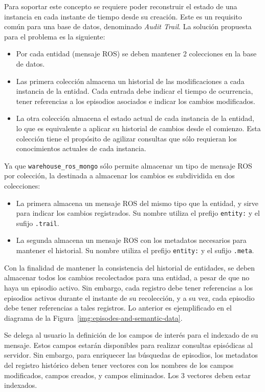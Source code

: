 Para soportar este concepto se requiere poder reconstruir el estado de una instancia en cada instante de tiempo desde su creación. Este es un requisito común para una base de datos, denominado \textit{Audit Trail}. La solución propuesta para el problema es la siguiente:
\begin{itemize}
\item Por cada entidad (mensaje ROS) se deben mantener 2 colecciones en la base de datos.
\item Las primera colección almacena un historial de las modificaciones a cada instancia de la entidad. Cada entrada debe indicar el tiempo de ocurrencia, tener referencias a los episodios asociados e indicar los cambios modificados.
\item La otra colección almacena el estado actual de cada instancia de la entidad, lo que es equivalente a aplicar su historial de cambios desde el comienzo. Esta colección tiene el propósito de agilizar consultas que sólo requieran los conocimientos actuales de cada instancia.
\end{itemize}
Ya que \texttt{warehouse\_ros\_mongo} sólo permite almacenar un tipo de mensaje ROS por colección, la destinada a almacenar los cambios es subdividida en dos colecciones:
\begin{itemize}
\item La primera almacena un mensaje ROS del mismo tipo que la entidad, y sirve para indicar los cambios registrados. Su nombre utiliza el prefijo \texttt{entity:} y el sufijo \texttt{.trail}.
\item La segunda almacena un mensaje ROS con los metadatos necesarios para mantener el historial. Su nombre utiliza el prefijo \texttt{entity:} y el sufijo \texttt{.meta}.
\end{itemize}

Con la finalidad de mantener la consistencia del historial de entidades, se deben almacenar todos los cambios recolectados para una entidad, a pesar de que no haya un episodio activo. Sin embargo, cada registro debe tener referencias a los episodios activos durante el instante de su recolección, y a su vez, cada episodio debe tener referencias a tales registros. Lo anterior es ejemplificado en el diagrama de la Figura~\ref{img:episodes-and-semantic-data}.

Se delega al usuario la definición de los campos de interés para el indexado de su mensaje. Estos campos estarán disponibles para realizar consultas episódicas al servidor. Sin embargo, para enriquecer las búsquedas de episodios, los metadatos del registro histórico deben tener vectores con los nombres de los campos modificados, campos creados, y campos eliminados. Los 3 vectores deben estar indexados.


